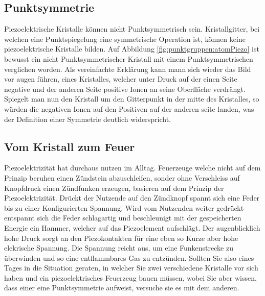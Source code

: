 \subsection{Punktsymmetrie}
Piezoelektrische Kristalle können nicht Punktsymmetrisch sein.
Kristallgitter, bei welchen eine Punktspiegelung eine symmetrische Operation ist, können keine piezoelektrische Kristalle bilden.
Auf Abbildung \ref{fig:punktgruppen:atomPiezo} ist bewusst  ein nicht Punktsymmetrischer Kristall 
mit einem Punktsymmetrischen verglichen worden.
Als vereinfachte Erklärung kann mann sich wieder das Bild vor augen führen, eines Kristalles, 
welcher unter Druck auf der einen Seite negative und der anderen Seite positive Ionen an seine Oberfläche verdrängt.
Spiegelt man nun den Kristall um den Gitterpunkt in der mitte des Kristalles, so würden die negativen Ionen auf den Positiven auf der anderen seite landen,
was der Definition einer Symmetrie deutlich widerspricht.

\subsection{Vom Kristall zum Feuer}
Piezoelektrizität hat durchaus nutzen im Alltag.
Feuerzeuge welche nicht auf dem Prinzip beruhen einen Zündstein abzuschleifen, 
sonder ohne Verschleiss auf Knopfdruck einen Zündfunken erzeugen, basieren auf dem Prinzip der Piezoelektrizität.
Drückt der Nutzende auf den Zündknopf spannt sich eine Feder bis zu einer Konfigurierten Spannung.
Wird vom Nutzenden weiter gedrückt entspannt sich die Feder schlagartig und beschleunigt mit der gespeicherten Energie ein Hammer,
welcher auf das Piezoelement aufschlägt.
Der augenblicklich hohe Druck sorgt an den Piezokontakten für eine eben so Kurze aber hohe elekrische Spannung.
Die Spannung reicht aus, um eine Funkenstrecke zu überwinden und so eine entflammbares Gas zu entzünden.
Sollten Sie also eines Tages in die Situation geraten, in welcher Sie zwei verschiedene Kristalle vor sich haben
und ein piezoelektrisches Feuerzeug bauen müssen,
wobei Sie aber wissen, dass einer eine Punktsymmetrie aufweist,
versuche sie es mit dem anderen.

